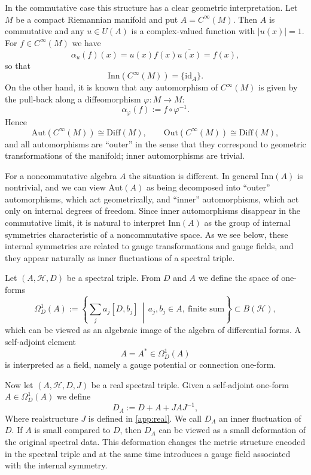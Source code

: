 \documentclass[12pt]{article}
\theoremstyle{definition} %
\theoremstyle{plain} %
\theoremstyle{remark} %
\theoremstyle{underline}
\begin{document}
In the commutative case this structure has a clear geometric interpretation.
Let $M$ be a compact Riemannian manifold and put $A=C^\infty(M)$.
Then $A$ is commutative and any $u\in U(A)$ is a complex-valued function with
$|u(x)|=1$.
For $f\in C^\infty(M)$ we have
\[
  \alpha_u(f)(x) = u(x) f(x) \overline{u(x)} = f(x),
\]
so that
\[
  \mathrm{Inn}(C^\infty(M)) = \{ \mathrm{id}_A \}.
\]
On the other hand, it is known that any automorphism of $C^\infty(M)$ is given by
the pull-back along a diffeomorphism $\varphi\colon M\to M$:
\[
  \alpha_\varphi(f) := f\circ\varphi^{-1}.
\]
Hence
\[
  \mathrm{Aut}(C^\infty(M)) \cong \mathrm{Diff}(M),\qquad
  \mathrm{Out}(C^\infty(M)) \cong \mathrm{Diff}(M),
\]
and all automorphisms are “outer” in the sense that they correspond to geometric
transformations of the manifold; inner automorphisms are trivial.

For a noncommutative algebra $A$ the situation is different.
In general $\mathrm{Inn}(A)$ is nontrivial, and we can view
$\mathrm{Aut}(A)$ as being decomposed into “outer” automorphisms, which act
geometrically, and “inner” automorphisms, which act only on internal degrees of
freedom.
Since inner automorphisms disappear in the commutative limit, it is natural to
interpret $\mathrm{Inn}(A)$ as the group of internal symmetries characteristic
of a noncommutative space.
As we see below, these internal symmetries are related to gauge transformations
and gauge fields, and they appear naturally as inner fluctuations of a spectral
triple.

Let $(A,\mathcal{H},D)$ be a spectral triple.
From $D$ and $A$ we define the space of one-forms
\[
  \Omega^1_D(A)
  := \left\{ \sum_{j} a_j [D,b_j] \,\middle|\,
                a_j,b_j \in A,\ \text{finite sum} \right\}
  \subset B(\mathcal{H}),
\]
which can be viewed as an algebraic image of the algebra of differential forms.
A self-adjoint element
\[
  A = A^\ast \in \Omega^1_D(A)
\]
is interpreted as a field, namely a gauge potential or connection one-form.

Now let $(A,\mathcal{H},D,J)$ be a real spectral triple.
Given a self-adjoint one-form $A\in\Omega^1_D(A)$ we define
\[
  D_A := D + A + JAJ^{-1},
\]
Where realstructure $J$ is defined in \ref{app:real}.
We call $D_A$ an inner fluctuation of $D$.
If $A$ is small compared to $D$, then $D_A$ can be viewed as a small deformation
of the original spectral data.
This deformation changes the metric structure encoded in the spectral triple and
at the same time introduces a gauge field associated with the internal symmetry.
\end{document}
